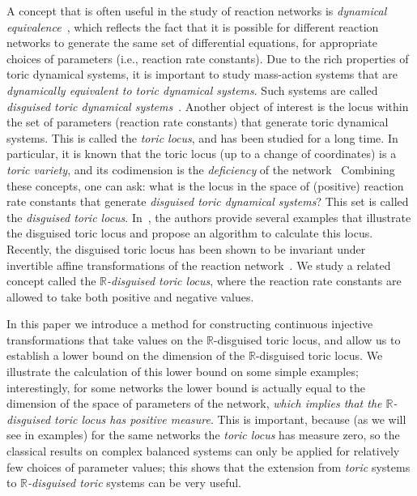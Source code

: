 \documentclass[11pt]{article}
\theoremstyle{plain}
\theoremstyle{definition}
\theoremstyle{remark}
\newcommand\RR{\mathbb{R}}
\begin{document}
A concept that is often useful in the study of reaction networks is \emph{dynamical equivalence}~\cite{craciun2008identifiability, horn1972general}, which reflects the fact that it is possible for different reaction networks to generate the same set of  differential equations, for appropriate choices of parameters (i.e., reaction rate constants). Due to the rich properties of toric dynamical systems, it is important  to study mass-action systems that are {\em dynamically equivalent to toric dynamical systems}. Such systems are called \emph{disguised toric dynamical systems}~\cite{2022disguised}. Another object of interest is the locus within the set of parameters (reaction rate constants) that generate toric dynamical systems. This is called the \emph{toric locus}, and has been studied for a long time. In particular, it is known that the toric locus (up to a change of coordinates) is a \emph{toric variety}, and its codimension is the {\em deficiency} of the network~\cite{CraciunDickensteinShiuSturmfels2009, craciun2020structure, michalek2021invitation}
Combining these concepts, one can ask: what is the locus in the space of (positive) reaction rate constants that generate {\em disguised toric dynamical systems}? This set is called the \emph{disguised toric locus}. In~\cite{2022disguised}, the authors provide several examples that illustrate the disguised toric locus and propose an algorithm to calculate this locus. 
Recently, the disguised toric locus has been shown to be invariant under invertible affine transformations of the reaction network~\cite{haque2022disguised}. We study a related concept called the \emph{$\RR$-disguised toric locus}, where the reaction rate constants are allowed to take both positive and negative values.

In this paper we introduce a method for constructing continuous injective transformations that take values on the $\RR$-disguised toric locus, and allow us to establish a lower bound on the dimension of the  $\RR$-disguised toric locus. We illustrate the calculation of this lower bound on some simple examples; interestingly, for some networks the lower bound is actually equal to the dimension of the space of parameters of the network,  {\em which implies that the  $\RR$-disguised toric locus has positive measure}. This is important, because (as we will see in examples) for the same networks  the {\em toric locus} has measure zero, so the classical results on complex balanced systems can only be applied for relatively few choices of parameter values; this shows that the extension from {\em toric} systems to {\em  $\RR$-disguised toric} systems can be very useful.   
\end{document}
